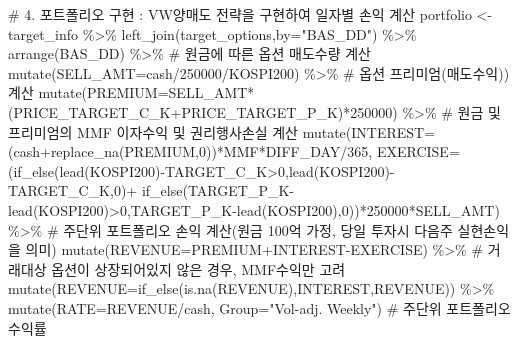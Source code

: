 \documentclass[
  a4paper,
  DIV=11,
  numbers=noendperiod]{scrreprt}
\newenvironment{Shaded}{\begin{snugshade}}{\end{snugshade}}
\newcommand{\AttributeTok}[1]{\textcolor[rgb]{0.40,0.45,0.13}{#1}}
\newcommand{\CommentTok}[1]{\textcolor[rgb]{0.37,0.37,0.37}{#1}}
\newcommand{\DecValTok}[1]{\textcolor[rgb]{0.68,0.00,0.00}{#1}}
\newcommand{\FunctionTok}[1]{\textcolor[rgb]{0.28,0.35,0.67}{#1}}
\newcommand{\NormalTok}[1]{\textcolor[rgb]{0.00,0.23,0.31}{#1}}
\newcommand{\OtherTok}[1]{\textcolor[rgb]{0.00,0.23,0.31}{#1}}
\newcommand{\SpecialCharTok}[1]{\textcolor[rgb]{0.37,0.37,0.37}{#1}}
\newcommand{\StringTok}[1]{\textcolor[rgb]{0.13,0.47,0.30}{#1}}
\begin{document}
\begin{Shaded}
\begin{Highlighting}[]
\CommentTok{\# 4. 포트폴리오 구현 : VW양매도 전략을 구현하여 일자별 손익 계산}
\NormalTok{portfolio }\OtherTok{\textless{}{-}}\NormalTok{ target\_info }\SpecialCharTok{\%\textgreater{}\%} 
  \FunctionTok{left\_join}\NormalTok{(target\_options,}\AttributeTok{by=}\StringTok{"BAS\_DD"}\NormalTok{) }\SpecialCharTok{\%\textgreater{}\%} 
  \FunctionTok{arrange}\NormalTok{(BAS\_DD) }\SpecialCharTok{\%\textgreater{}\%} 
  \CommentTok{\# 원금에 따른 옵션 매도수량 계산}
  \FunctionTok{mutate}\NormalTok{(}\AttributeTok{SELL\_AMT=}\NormalTok{cash}\SpecialCharTok{/}\DecValTok{250000}\SpecialCharTok{/}\NormalTok{KOSPI200) }\SpecialCharTok{\%\textgreater{}\%} 
  \CommentTok{\# 옵션 프리미엄(매도수익)) 계산}
  \FunctionTok{mutate}\NormalTok{(}\AttributeTok{PREMIUM=}\NormalTok{SELL\_AMT}\SpecialCharTok{*}\NormalTok{(PRICE\_TARGET\_C\_K}\SpecialCharTok{+}\NormalTok{PRICE\_TARGET\_P\_K)}\SpecialCharTok{*}\DecValTok{250000}\NormalTok{) }\SpecialCharTok{\%\textgreater{}\%} 
  \CommentTok{\# 원금 및 프리미엄의 MMF 이자수익 및 권리행사손실 계산}
  \FunctionTok{mutate}\NormalTok{(}\AttributeTok{INTEREST=}\NormalTok{(cash}\SpecialCharTok{+}\FunctionTok{replace\_na}\NormalTok{(PREMIUM,}\DecValTok{0}\NormalTok{))}\SpecialCharTok{*}\NormalTok{MMF}\SpecialCharTok{*}\NormalTok{DIFF\_DAY}\SpecialCharTok{/}\DecValTok{365}\NormalTok{,}
         \AttributeTok{EXERCISE=}\NormalTok{(}\FunctionTok{if\_else}\NormalTok{(}\FunctionTok{lead}\NormalTok{(KOSPI200)}\SpecialCharTok{{-}}\NormalTok{TARGET\_C\_K}\SpecialCharTok{\textgreater{}}\DecValTok{0}\NormalTok{,}\FunctionTok{lead}\NormalTok{(KOSPI200)}\SpecialCharTok{{-}}\NormalTok{TARGET\_C\_K,}\DecValTok{0}\NormalTok{)}\SpecialCharTok{+}
                     \FunctionTok{if\_else}\NormalTok{(TARGET\_P\_K}\SpecialCharTok{{-}}\FunctionTok{lead}\NormalTok{(KOSPI200)}\SpecialCharTok{\textgreater{}}\DecValTok{0}\NormalTok{,TARGET\_P\_K}\SpecialCharTok{{-}}\FunctionTok{lead}\NormalTok{(KOSPI200),}\DecValTok{0}\NormalTok{))}\SpecialCharTok{*}\DecValTok{250000}\SpecialCharTok{*}\NormalTok{SELL\_AMT) }\SpecialCharTok{\%\textgreater{}\%} 
  \CommentTok{\# 주단위 포트폴리오 손익 계산(원금 100억 가정, 당일 투자시 다음주 실현손익을 의미)}
  \FunctionTok{mutate}\NormalTok{(}\AttributeTok{REVENUE=}\NormalTok{PREMIUM}\SpecialCharTok{+}\NormalTok{INTEREST}\SpecialCharTok{{-}}\NormalTok{EXERCISE) }\SpecialCharTok{\%\textgreater{}\%} 
  \CommentTok{\# 거래대상 옵션이 상장되어있지 않은 경우, MMF수익만 고려}
  \FunctionTok{mutate}\NormalTok{(}\AttributeTok{REVENUE=}\FunctionTok{if\_else}\NormalTok{(}\FunctionTok{is.na}\NormalTok{(REVENUE),INTEREST,REVENUE)) }\SpecialCharTok{\%\textgreater{}\%} 
  \FunctionTok{mutate}\NormalTok{(}\AttributeTok{RATE=}\NormalTok{REVENUE}\SpecialCharTok{/}\NormalTok{cash,}
         \AttributeTok{Group=}\StringTok{"Vol{-}adj. Weekly"}\NormalTok{)  }\CommentTok{\# 주단위 포트폴리오 수익률}


\end{Highlighting}
\end{Shaded}
\end{document}

